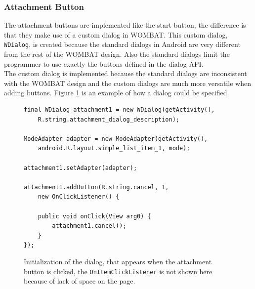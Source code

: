 \subsubsection*{Attachment Button}
\label{subsubsec:attach}
The attachment buttons are implemented like the start button, the difference is that they make use of a custom dialog in WOMBAT.
This custom dialog, \texttt{WDialog}, is created because the standard dialogs in Android are very different from the rest of the WOMBAT design.
Also the standard dialogs limit the programmer to use exactly the buttons defined in the dialog API.\\
The custom dialog is implemented because the standard dialogs are inconsistent with the WOMBAT design and the custom dialogs are much more versatile when adding buttons.
Figure \ref{code:customize:wdialog} is an example of how a dialog could be specified.

\begin{figure}[H]
\begin{lstlisting}
final WDialog attachment1 = new WDialog(getActivity(),
	R.string.attachment_dialog_description);

ModeAdapter adapter = new ModeAdapter(getActivity(),
	android.R.layout.simple_list_item_1, mode);

attachment1.setAdapter(adapter);

attachment1.addButton(R.string.cancel, 1,
	new OnClickListener() {

	public void onClick(View arg0) {
		attachment1.cancel();
	}
});
\end{lstlisting}
\caption{Initialization of the dialog, that appears when the attachment button is clicked, the \texttt{OnItemClickListener} is not shown here because of lack of space on the page.}%
\label{code:customize:wdialog}%
\end{figure}